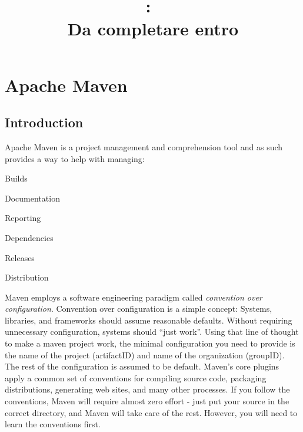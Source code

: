 \documentclass{article}
\title{
\vspace{2in}
\textmd{\textbf{\hmwkClass:\ \hmwkTitle}}\\
\normalsize\vspace{0.1in}\small{Da completare entro \hmwkDueDate}\\
\vspace{0.1in}\large{\textit{\hmwkClassInstructor}}
\vspace{3in}
}
\author{\textbf{\hmwkAuthorName}}
\date{} %
\begin{document}
\maketitle



\newpage
\tableofcontents
\newpage



\section{Apache Maven}
\subsection{Introduction}
Apache Maven is a project management and comprehension tool and as such
provides a way to help with managing: 

\begin{compactitem}
\item Builds
\item Documentation
\item Reporting
\item Dependencies
\item Releases
\item Distribution
\end{compactitem}

Maven employs a software engineering paradigm called \emph{convention
  over configuration}.
Convention over configuration is a simple concept: Systems, libraries,
and frameworks should assume reasonable defaults. Without requiring
unnecessary configuration, systems should ``just work''. Using that line
of thought to make a maven project work, the minimal configuration
you need to provide is the name of the project (artifactID) and name of
the organization (groupID). The rest of the configuration is
assumed to be default. Maven's core plugins apply a common
set of conventions for compiling source code, packaging distributions,
generating web sites, and many other processes.
If you follow the conventions, Maven will require almost
zero effort - just put your source in the correct directory, and Maven
will take care of the rest. However, you will need to learn the
conventions first.
\end{document}
